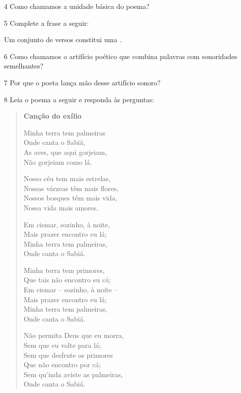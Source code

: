 \num{4} Como chamamos a unidade básica do poema?


\num{5} Complete a frase a seguir:

Um conjunto de versos constitui uma \preencher.


\num{6} Como chamamos o artifício poético que combina palavras com
sonoridades semelhantes?



\num{7} Por que o poeta lança mão desse artifício sonoro?



\num{8} Leia o poema a seguir e responda às perguntas:


\begin{quote}
\textbf{Canção do exílio}

Minha terra tem palmeiras\\
Onde canta o Sabiá,\\
As aves, que aqui gorjeiam,\\
Não gorjeiam como lá.

Nosso céu tem mais estrelas,\\
Nossas várzeas têm mais flores,\\
Nossos bosques têm mais vida,\\
Nossa vida mais amores.

Em cismar, sozinho, à noite,\\
Mais prazer encontro eu lá;\\
Minha terra tem palmeiras,\\
Onde canta o Sabiá.

Minha terra tem primores,\\
Que tais não encontro eu cá;\\
Em cismar -- sozinho, à noite --\\
Mais prazer encontro eu lá;\\
Minha terra tem palmeiras,\\
Onde canta o Sabiá.

Não permita Deus que eu morra,\\
Sem que eu volte para lá;\\
Sem que desfrute os primores\\
Que não encontro por cá;\\
Sem qu'inda aviste as palmeiras,\\
Onde canta o Sabiá.

\end{quote}


